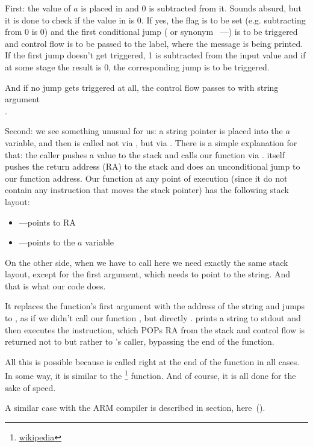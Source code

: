 First: the value of $a$ is placed in \EAX and 0 is subtracted from it. Sounds absurd, but it is done to check if 
the value in \EAX is 0. If yes, the \ZF flag is to be set (e.g. subtracting from 0 is 0) 
and the first conditional jump \JE ( or synonym \JZ~---) is to be triggered 
and control flow is to be passed to the  label, where the  message is being printed. 
If the first jump doesn't get triggered, 1 is subtracted from the input value and if at some stage the result is 0, 
the corresponding jump is to be triggered.

And if no jump gets triggered at all, the control flow passes to \printf with string argument \\
.

\label{jump_to_last_printf}
\myindex{\Stack}

Second: we see something unusual for us: a string pointer is placed into the $a$ variable, and 
then \printf is called not via \CALL, but via \JMP. There is a simple explanation for that: 
the \gls{caller} pushes a value to the stack and calls our function via \CALL. 
\CALL itself pushes the return address (\ac{RA}) to the stack and does an unconditional jump to our function address. 
Our function at any point of execution (since it do not contain any instruction that moves the stack 
pointer) has the following stack layout:

\begin{itemize}
\item\ESP---points to \ac{RA}
\item{}---points to the $a$ variable 
\end{itemize}

On the other side, when we have to call \printf here we need exactly the same stack 
layout, except for the first \printf argument, which needs to point to the string. 
And that is what our code does.

It replaces the function's first argument with the address of the string and 
jumps to \printf, as if we didn't call our function \ttf, but directly \printf.
\printf prints a string to \gls{stdout} and then executes the \RET instruction, which POPs 
\ac{RA} from the stack and control flow is returned not to \ttf but rather to \ttf's \gls{caller}, 
bypassing the end of the \ttf function.

\newcommand{\URLSJ}{\href{http://go.yurichev.com/17121}{wikipedia}}

All this is possible because \printf is called right at the end of the \ttf function in all cases. 
In some way, it is similar to the \footnote{\URLSJ} function.
And of course, it is all done for the sake of speed.

A similar case with the ARM compiler is described in \q{\PrintfSeveralArgumentsSectionName}
section, here~().



